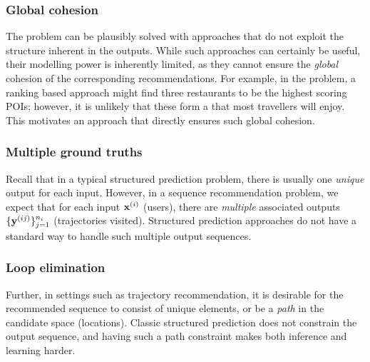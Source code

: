 \subsubsection{Global cohesion}
The {\seqrec} problem can be plausibly solved with approaches that do not exploit the structure inherent in the outputs. %
While such approaches can certainly be useful,
their modelling power is inherently limited,
as
they cannot ensure the \emph{global} cohesion of the corresponding recommendations. %
For example, in the {\trajrec} problem, a ranking based approach %
might find three restaurants to be the highest scoring POIs;
however, it is unlikely that these form a {\trajectory} that most travellers will enjoy.
This motivates an approach %
that directly ensures such global cohesion.


\subsubsection{Multiple ground truths}
%
Recall that in a typical structured prediction problem,
there is usually one \emph{unique} output for each input.
However, in a sequence recommendation problem,
we expect that for each input $\mathbf{x}^{({i})}$ (\eg users),
there are \emph{multiple} associated outputs
$\{ \mathbf{y}^{({ij})} \}_{j=1}^{n_i}$ (\ie trajectories visited).
Structured prediction approaches do not have a standard way to handle such multiple output sequences.


\subsubsection{Loop elimination}
Further, in settings such as trajectory recommendation, it is desirable for the recommended sequence to consist of unique elements,
or be a {\em path} in the candidate space (\eg locations).
Classic structured prediction does not constrain the output sequence, and having such a
path constraint makes both inference and learning harder.


